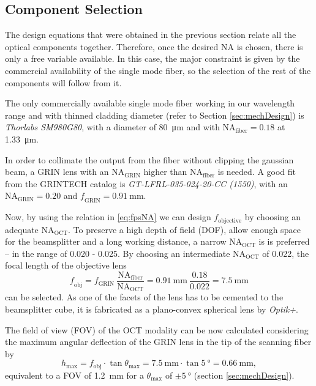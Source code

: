 \subsection{Component Selection}
The design equations that were obtained in the previous section relate all the optical components together. Therefore, once the desired NA is chosen, there is only a free variable available. In this case, the major constraint is given by the commercial availability of the single mode fiber, so the selection of the rest of the components will follow from it.

The only commercially available single mode fiber working in our wavelength range and with thinned cladding diameter (refer to Section \ref{sec:mechDesign}) is \textit{Thorlabs SM980G80}, with a diameter of \SI{80}{\micro\meter} and with $\mathrm{NA_\mathrm{fiber}} = 0.18$ at \SI{1.33}{\micro\meter}. 

In order to collimate the output from the fiber without clipping the gaussian beam, a GRIN lens with an $\mathrm{NA_{GRIN}}$ higher than $\mathrm{NA_{fiber}}$ is needed. A good fit from the GRINTECH catalog is \textit{GT-LFRL-035-024-20-CC (1550)}, with an $\mathrm{NA_\mathrm{GRIN}} = 0.20$ and $\mathit{f_\mathrm{GRIN}} = \SI{0.91}{\milli\meter}$. 

Now, by using the relation in \autoref{eq:fpsNA} we can design $f_\mathrm{objective}$ by choosing an adequate $\mathrm{NA_\mathrm{OCT}}$. To preserve a high depth of field (DOF), allow enough space for the beamsplitter and a long working distance, a narrow $\mathrm{NA_\mathrm{OCT}}$ is is preferred -- in the range of 0.020 - 0.025. By choosing an intermediate $\mathrm{NA_\mathrm{OCT}}$ of 0.022, the focal length of the objective lens 
\begin{equation}
\mathit{f_\mathrm{obj}} = f_\mathrm{GRIN}\ \frac{\mathrm{NA_\mathrm{fiber}}}{\mathrm{NA_\mathrm{OCT}}}  = \SI{0.91}{\milli\meter}\ \frac{0.18}{0.022} = \SI{7.5}{\milli\meter}
\end{equation}
can be selected. As one of the facets of the lens has to be cemented to the beamsplitter cube, it is fabricated as a plano-convex spherical lens by \textit{Optik+}.

The field of view (FOV) of the OCT modality can be now calculated considering the maximum angular deflection of the GRIN lens in the tip of the scanning fiber by 
\begin{equation}
h_\mathrm{max} = f_\mathrm{obj}\cdot \tan  \theta_\mathrm{max} = \SI{7.5}{\milli\meter} \cdot \tan \SI{5}{\degree} = \SI{0.66}{\milli\meter}, 
\end{equation}
equivalent to a FOV of \SI{1.2}{\milli\meter} for a $\theta_\mathrm{max} $ of $ \pm \SI{5}{\degree}$ (section \ref{sec:mechDesign}).



